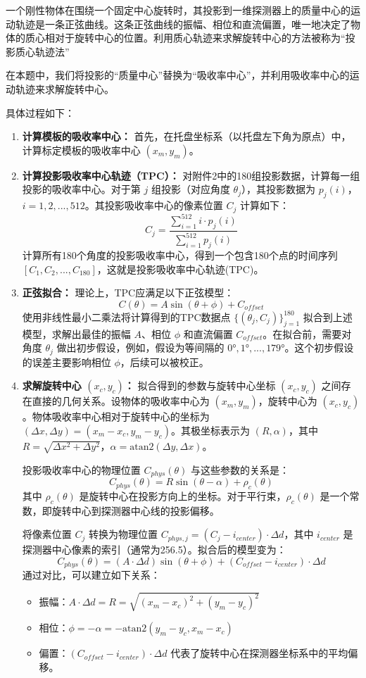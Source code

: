 一个刚性物体在围绕一个固定中心旋转时，其投影到一维探测器上的质量中心的运动轨迹是一条正弦曲线。这条正弦曲线的振幅、相位和直流偏置，唯一地决定了物体的质心相对于旋转中心的位置。利用质心轨迹来求解旋转中心的方法被称为“投影质心轨迹法”\par
在本题中，我们将投影的“质量中心”替换为“吸收率中心”，并利用吸收率中心的运动轨迹来求解旋转中心。\par
具体过程如下：
\begin{enumerate}
    \item \textbf{计算模板的吸收率中心：} 首先，在托盘坐标系（以托盘左下角为原点）中，计算标定模板的吸收率中心 $(x_m,y_m)$。
    \item \textbf{计算投影吸收率中心轨迹（TPC）：} 对附件2中的180组投影数据，计算每一组投影的吸收率中心。对于第 $j$ 组投影（对应角度 $\theta_j$），其投影数据为 $p_j(i)$，$i=1,2,...,512$。其投影吸收率中心的像素位置 $C_j$ 计算如下：
       $$C_j=\frac{\sum_{i=1}^{512}i\cdot p_j(i)}{\sum_{i=1}^{512}p_j(i)}$$
       计算所有180个角度的投影吸收率中心，得到一个包含180个点的时间序列 $[C_1,C_2,...,C_{180}]$，这就是投影吸收率中心轨迹(TPC)。
    \item \textbf{正弦拟合：} 理论上，TPC应满足以下正弦模型：
       $$C(\theta)=A\sin(\theta+\phi)+C_{offset}$$
       使用非线性最小二乘法将计算得到的TPC数据点 $\{(\theta_j,C_j)\}_{j=1}^{180}$ 拟合到上述模型，求解出最佳的振幅 $A$、相位 $\phi$ 和直流偏置 $C_{offset}$。在拟合前，需要对角度 $\theta_j$ 做出初步假设，例如，假设为等间隔的 $0°,1°,...,179°$。这个初步假设的误差主要影响相位 $\phi$，后续可以被校正。
    \item \textbf{求解旋转中心 $(x_c,y_c)$：} 拟合得到的参数与旋转中心坐标 $(x_c,y_c)$ 之间存在直接的几何关系。设物体的吸收率中心为 $(x_m,y_m)$，旋转中心为 $(x_c,y_c)$。物体吸收率中心相对于旋转中心的坐标为 $(\Delta x,\Delta y)=(x_m-x_c,y_m-y_c)$。其极坐标表示为 $(R,\alpha)$，其中 $R=\sqrt{\Delta x^2+\Delta y^2}$，$\alpha=\text{atan2}(\Delta y,\Delta x)$。
       
       投影吸收率中心的物理位置 $C_{phys}(\theta)$ 与这些参数的关系是：
       $$C_{phys}(\theta)=R\sin(\theta-\alpha)+\rho_c(\theta)$$
       其中 $\rho_c(\theta)$ 是旋转中心在投影方向上的坐标。对于平行束，$\rho_c(\theta)$ 是一个常数，即旋转中心到探测器中心线的投影偏移。
       
       将像素位置 $C_j$ 转换为物理位置 $C_{phys,j}=(C_j-i_{center})\cdot\Delta d$，其中 $i_{center}$ 是探测器中心像素的索引（通常为256.5）。拟合后的模型变为：
       $$C_{phys}(\theta)=(A\cdot\Delta d)\sin(\theta+\phi)+(C_{offset}-i_{center})\cdot\Delta d$$
       通过对比，可以建立如下关系：
       \begin{itemize}
           \item 振幅：$A\cdot\Delta d=R=\sqrt{(x_m-x_c)^2+(y_m-y_c)^2}$
           \item 相位：$\phi=-\alpha=-\text{atan2}(y_m-y_c,x_m-x_c)$
           \item 偏置：$(C_{offset}-i_{center})\cdot\Delta d$ 代表了旋转中心在探测器坐标系中的平均偏移。
       \end{itemize}
\end{enumerate}

